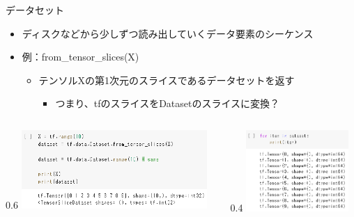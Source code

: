 \documentclass[aspectratio=169, dvipdfmx, 14pt, xcolor={svgnames,dvipsnames}, t]{beamer}
\newlength{\mytotalwidth}
\newlength{\mycolumnwidth}
\begin{document}
\begin{frame}{データセット}

  \begin{itemize}
    \tightlist
    \item
          ディスクなどから少しずつ読み出していくデータ要素のシーケンス
    \item
          例：from\_tensor\_slices(X)

          \begin{itemize}
            \tightlist
            \item
                  テンソルXの第1次元のスライスであるデータセットを返す
                  \begin{itemize}
                    \tightlist
                    \item
                          つまり、\alert{tfのスライスをDatasetのスライスに変換}？
                  \end{itemize}
          \end{itemize}
  \end{itemize}

  \begin{columns}[totalwidth=\mytotalwidth]
    \begin{column}[T]{0.6\mycolumnwidth}
      \centering
      \includegraphics[width=200pt]{img/hands-on-ml_13-1_1.png}
    \end{column}
    \begin{column}[T]{0.4\mycolumnwidth}
      \centering
      \includegraphics[width=110pt]{img/hands-on-ml_13-1_2.png}
    \end{column}
  \end{columns}

\end{frame}

\end{document}
